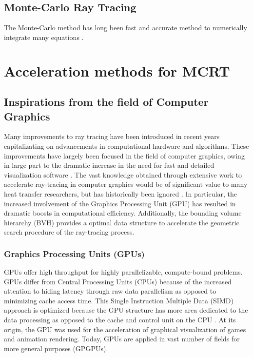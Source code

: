 \subsection{Monte-Carlo Ray Tracing}
The Monte-Carlo method has long been fast and accurate method to numerically integrate many equations \cite{Howell2021TheTransfer}.

\section{Acceleration methods for MCRT}








\subsection{Inspirations from the field of Computer Graphics}
Many improvements to ray tracing have been introduced in recent years capitalizating on advancements in computational hardware and algorithms.
These improvements have largely been focused in the field of computer graphics, owing in large part to the dramatic increase in the need for fast and detailed visualization software \cite{Gupta2020CUDAComputing}. 
The vast knowledge obtained through extensive work to accelerate ray-tracing in computer graphics would be of significant value to many heat transfer researchers, but has historically been ignored \cite{Howell2021TheTransfer}. In particular, the increased involvement of the Graphics Processing Unit (GPU) has resulted in dramatic boosts in computational efficiency. Additionally, the bounding volume hierarchy (BVH) provides a optimal data structure to accelerate the geometric search procedure of the ray-tracing process.

\subsubsection{Graphics Processing Units (GPUs)}
GPUs offer high throughput for highly parallelizable, compute-bound problems.
GPUs differ from Central Processing Units (CPUs) because of the increased attention to hiding latency through raw data parallelism as opposed to minimizing cache access time. 
This Single Instruction Multiple Data (SIMD) approach is optimized because the GPU structure has more area dedicated to the data processing as opposed to the cache and control unit on the CPU \cite{Gupta2020CUDAComputing}.
At its origin, the GPU was used for the acceleration of graphical visualization of games and animation rendering. Today, GPUs are applied in vast number of fields for more general purposes (GPGPUs).

